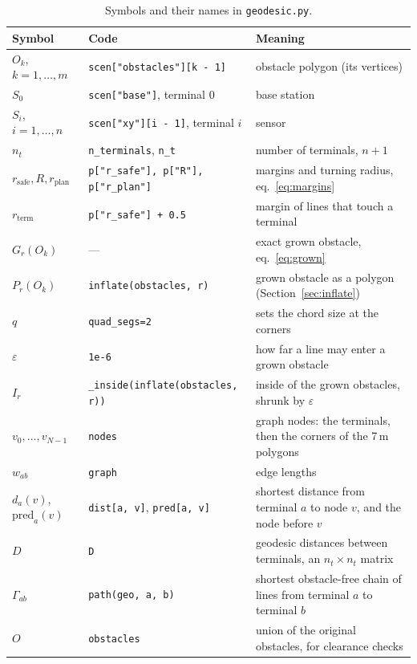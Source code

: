\documentclass[10pt]{article}
\newcommand{\code}[1]{\texttt{#1}}
\newcommand{\rplan}{r_{\mathrm{plan}}}
\newcommand{\rsafe}{r_{\mathrm{safe}}}
\newcommand{\rterm}{r_{\mathrm{term}}}
\newcommand{\pred}{\mathrm{pred}}
\begin{document}
\begin{table}[H]
\centering
\small
\caption{Symbols and their names in \code{geodesic.py}.}
\label{tab:notation}
\begin{tabularx}{\textwidth}{@{}l l >{\raggedright\arraybackslash}X@{}}
\toprule
Symbol & Code & Meaning \\
\midrule
$O_k$, $k = 1, \ldots, m$ & \code{scen["obstacles"][k - 1]} & obstacle polygon (its vertices) \\
$S_0$ & \code{scen["base"]}, terminal 0 & base station \\
$S_i$, $i = 1, \ldots, n$ & \code{scen["xy"][i - 1]}, terminal $i$ & sensor \\
$n_t$ & \code{n\_terminals}, \code{n\_t} & number of terminals, $n + 1$ \\
$\rsafe, R, \rplan$ & \code{p["r\_safe"], p["R"], p["r\_plan"]} & margins and turning radius, eq.~\eqref{eq:margins} \\
$\rterm$ & \code{p["r\_safe"] + 0.5} & margin of lines that touch a terminal \\
$G_r(O_k)$ & --- & exact grown obstacle, eq.~\eqref{eq:grown} \\
$P_r(O_k)$ & \code{inflate(obstacles, r)} & grown obstacle as a polygon (Section~\ref{sec:inflate}) \\
$q$ & \code{quad\_segs=2} & sets the chord size at the corners \\
$\varepsilon$ & \code{1e-6} & how far a line may enter a grown obstacle \\
$I_r$ & \code{\_inside(inflate(obstacles, r))} & inside of the grown obstacles, shrunk by $\varepsilon$ \\
$v_0, \ldots, v_{N-1}$ & \code{nodes} & graph nodes: the terminals, then the corners of the 7\,m polygons \\
$w_{ab}$ & \code{graph} & edge lengths \\
$d_a(v)$, $\pred_a(v)$ & \code{dist[a, v]}, \code{pred[a, v]} & shortest distance from terminal $a$ to node $v$, and the node before $v$ \\
$D$ & \code{D} & geodesic distances between terminals, an $n_t \times n_t$ matrix \\
$\Gamma_{ab}$ & \code{path(geo, a, b)} & shortest obstacle-free chain of lines from terminal $a$ to terminal $b$ \\
$O$ & \code{obstacles} & union of the original obstacles, for clearance checks \\
\bottomrule
\end{tabularx}
\end{table}
\end{document}

